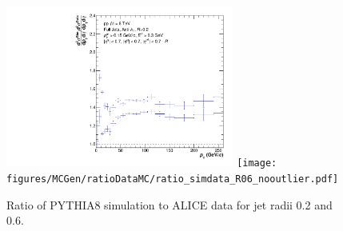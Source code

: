 \documentclass[ALICE]{ALICE_analysis_notes}
\begin{document}
\begin{figure}
    \centering
    \begin{multicols}{2}
            \includegraphics[width=7.5cm]{figures/MCGen/ratioDataMC/ratio_simdata_R02_nooutlier.pdf}
        \vfill\null
        \columnbreak
            \texttt{[image: figures/MCGen/ratioDataMC/ratio\_simdata\_R06\_nooutlier.pdf]}
        \vfill\null
    \end{multicols}
    \caption{Ratio of PYTHIA8 simulation to ALICE data for jet radii 0.2 and 0.6.}
    \label{fig:MCGen_RatioDataMC}
\end{figure}\clearpage{}
\end{document}
